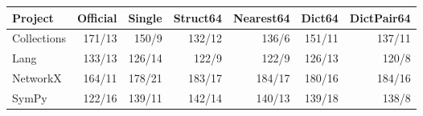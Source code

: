 \begin{tabular}{lrrrrrr}
\toprule
Project & Official & Single & Struct64 & Nearest64 & Dict64 & DictPair64 \\
\midrule
Collections & 171/13 & 150/9 & 132/12 & 136/6 & 151/11 & 137/11 \\
Lang & 133/13 & 126/14 & 122/9 & 122/9 & 126/13 & 120/8 \\
NetworkX & 164/11 & 178/21 & 183/17 & 184/17 & 180/16 & 184/16 \\
SymPy & 122/16 & 139/11 & 142/14 & 140/13 & 139/18 & 138/8 \\
\bottomrule
\end{tabular}
